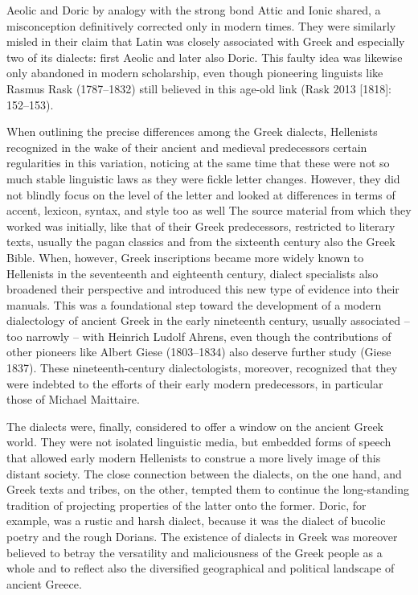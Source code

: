 \documentclass[12pt]{article}
\newenvironment{styleStandard}{\renewcommand\baselinestretch{1.25}\setlength\leftskip{0in}\setlength\rightskip{0in}\setlength\parindent{0.1972in}\setlength\parfillskip{0pt plus 1fil}\setlength\parskip{0in plus 1pt}\writerlistparindent\writerlistleftskip\leavevmode\normalfont\normalsize\writerlistlabel\ignorespaces}{\unskip\vspace{0in plus 1pt}\par}
\newcommand\writerlistleftskip{}
\newcommand\writerlistparindent{}
\newcommand\writerlistlabel{}
\begin{document}
\begin{styleStandard}
Aeolic and Doric by analogy with the strong bond Attic and Ionic shared, a misconception definitively corrected only in modern times. They were similarly misled in their claim that Latin was closely associated with Greek and especially two of its dialects: first Aeolic and later also Doric. This faulty idea was likewise only abandoned in modern scholarship, even though pioneering linguists like Rasmus Rask (1787–1832) still believed in this age-old link (Rask 2013 [1818]: 152–153).
\end{styleStandard}

\begin{styleStandard}
When outlining the precise differences among the Greek dialects, Hellenists recognized in the wake of their ancient and medieval predecessors certain regularities in this variation, noticing at the same time that these were not so much stable linguistic laws as they were fickle letter changes. However, they did not blindly focus on the level of the letter and looked at differences in terms of accent, lexicon, syntax, and style too as well The source material from which they worked was initially, like that of their Greek predecessors, restricted to literary texts, usually the pagan classics and from the sixteenth century also the Greek Bible. When, however, Greek inscriptions became more widely known to Hellenists in the seventeenth and eighteenth century, dialect specialists also broadened their perspective and introduced this new type of evidence into their manuals. This was a foundational step toward the development of a modern dialectology of ancient Greek in the early nineteenth century, usually associated – too narrowly – with Heinrich Ludolf Ahrens, even though the contributions of other pioneers like Albert Giese (1803–1834) also deserve further study (Giese 1837). These nineteenth-century dialectologists, moreover, recognized that they were indebted to the efforts of their early modern predecessors, in particular those of Michael Maittaire.
\end{styleStandard}

\begin{styleStandard}
The dialects were, finally, considered to offer a window on the ancient Greek world. They were not isolated linguistic media, but embedded forms of speech that allowed early modern Hellenists to construe a more lively image of this distant society. The close connection between the dialects, on the one hand, and Greek texts and tribes, on the other, tempted them to continue the long-standing tradition of projecting properties of the latter onto the former. Doric, for example, was a rustic and harsh dialect, because it was the dialect of bucolic poetry and the rough Dorians. The existence of dialects in Greek was moreover believed to betray the versatility and maliciousness of the Greek people as a whole and to reflect also the diversified geographical and political landscape of ancient Greece.
\end{styleStandard}
\end{document}
